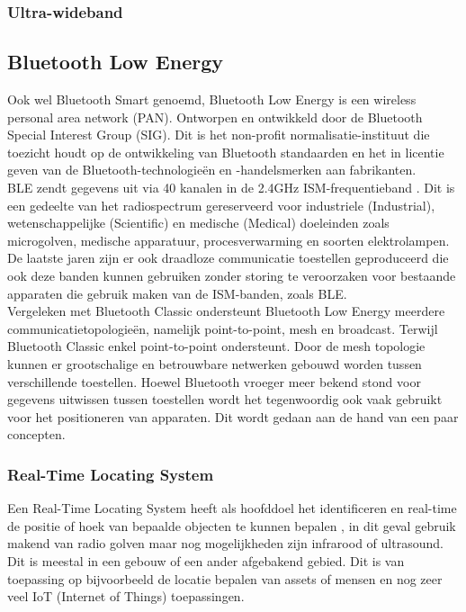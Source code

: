 \subsubsection{Ultra-wideband}



\subsection{Bluetooth Low Energy}
Ook wel Bluetooth Smart genoemd, Bluetooth Low Energy is een wireless personal area network (PAN). Ontworpen en ontwikkeld door de Bluetooth Special Interest Group (SIG). Dit is het non-profit normalisatie-instituut die toezicht houdt op de ontwikkeling van Bluetooth standaarden en het in licentie geven van de Bluetooth-technologieën en -handelsmerken aan fabrikanten. \\

BLE zendt gegevens uit via 40 kanalen in de 2.4GHz ISM-frequentieband \autocite{Kumbhar_2017}. Dit is een gedeelte van het radiospectrum gereserveerd voor industriele (Industrial), wetenschappelijke (Scientific) en medische (Medical) doeleinden zoals microgolven, medische apparatuur, procesverwarming en soorten elektrolampen. De laatste jaren zijn er ook draadloze communicatie toestellen geproduceerd die ook deze banden kunnen gebruiken zonder storing te veroorzaken voor bestaande apparaten die gebruik maken van de ISM-banden, zoals BLE.\\

Vergeleken met Bluetooth Classic ondersteunt Bluetooth Low Energy meerdere communicatietopologieën, namelijk point-to-point, mesh en broadcast. Terwijl Bluetooth Classic enkel point-to-point ondersteunt. Door de mesh topologie kunnen er grootschalige en betrouwbare netwerken gebouwd worden tussen verschillende toestellen. Hoewel Bluetooth vroeger meer bekend stond voor gegevens uitwissen tussen toestellen wordt het tegenwoordig ook vaak gebruikt voor het positioneren van apparaten. Dit wordt gedaan aan de hand van een paar concepten.

\subsubsection{Real-Time Locating System}

Een Real-Time Locating System heeft als hoofddoel het identificeren en real-time de positie of hoek van bepaalde objecten te kunnen bepalen \autocite{Lehtimaki2018}, in dit geval gebruik makend van radio golven maar nog mogelijkheden zijn infrarood of ultrasound. Dit is meestal in een gebouw of een ander afgebakend gebied. Dit is van toepassing op bijvoorbeeld de locatie bepalen van assets of mensen en nog zeer veel IoT (Internet of Things) toepassingen.

